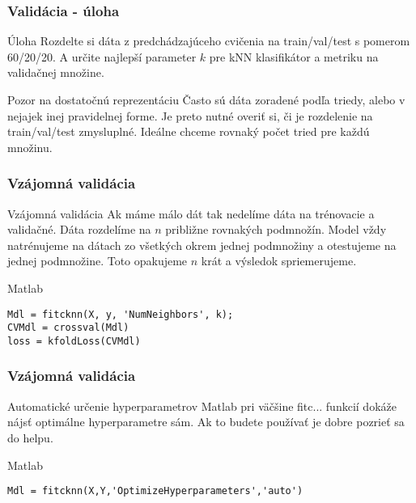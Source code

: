 \documentclass{beamer}
\begin{document}
\begin{frame}
\frametitle{Validácia - úloha}
\begin{block}{Úloha}
Rozdelte si dáta z predchádzajúceho cvičenia na train/val/test s pomerom 60/20/20. A určite najlepší parameter $k$ pre kNN klasifikátor a metriku na validačnej množine.
\end{block}

\begin{block}{Pozor na dostatočnú reprezentáciu}
Často sú dáta zoradené podľa triedy, alebo v nejajek inej pravidelnej forme. Je preto nutné overiť si, či je rozdelenie na train/val/test zmysluplné. Ideálne chceme rovnaký počet tried pre každú množinu. 
\end{block}
\end{frame}

\begin{frame}[fragile]
\frametitle{Vzájomná validácia}
\begin{block}{Vzájomná validácia}
Ak máme málo dát tak nedelíme dáta na trénovacie a validačné. Dáta rozdelíme na $n$ približne rovnakých podmnožín. Model vždy natrénujeme na dátach zo všetkých okrem jednej podmnožiny a otestujeme na jednej podmnožine. Toto opakujeme $n$ krát a výsledok spriemerujeme.
\end{block}

\begin{block}{Matlab}
\begin{verbatim}
Mdl = fitcknn(X, y, 'NumNeighbors', k);
CVMdl = crossval(Mdl)
loss = kfoldLoss(CVMdl) \end{verbatim}
\end{block}
\end{frame}



\begin{frame}[fragile]
\frametitle{Vzájomná validácia}
\begin{block}{Automatické určenie hyperparametrov}
Matlab pri väčšine fitc... funkcií dokáže nájsť optimálne hyperparametre sám. Ak to budete používať je dobre pozrieť sa do helpu.
\end{block}

\begin{block}{Matlab}
\begin{verbatim}
Mdl = fitcknn(X,Y,'OptimizeHyperparameters','auto')\end{verbatim}
\end{block}
\end{frame}
\end{document}
